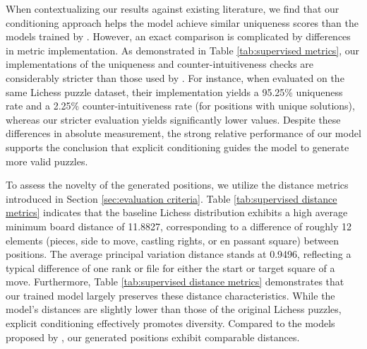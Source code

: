 When contextualizing our results against existing literature, we find that our conditioning approach helps the model achieve similar uniqueness scores than the models trained by \citeauthor{feng2025generatingcreativechesspuzzles} \cite{feng2025generatingcreativechesspuzzles}. However, an exact comparison is complicated by differences in metric implementation. As demonstrated in Table \ref{tab:supervised metrics}, our implementations of the uniqueness and counter-intuitiveness checks are considerably stricter than those used by \citeauthor{feng2025generatingcreativechesspuzzles} \cite{feng2025generatingcreativechesspuzzles}. For instance, when evaluated on the same Lichess puzzle dataset, their implementation yields a 95.25\% uniqueness rate and a 2.25\% counter-intuitiveness rate (for positions with unique solutions), whereas our stricter evaluation yields significantly lower values. Despite these differences in absolute measurement, the strong relative performance of our model supports the conclusion that explicit conditioning guides the model to generate more valid puzzles.

To assess the novelty of the generated positions, we utilize the distance metrics introduced in Section \ref{sec:evaluation criteria}. Table \ref{tab:supervised distance metrics} indicates that the baseline Lichess distribution exhibits a high average minimum board distance of 11.8827, corresponding to a difference of roughly 12 elements (pieces, side to move, castling rights, or en passant square) between positions. The average principal variation distance stands at 0.9496, reflecting a typical difference of one rank or file for either the start or target square of a move. Furthermore, Table \ref{tab:supervised distance metrics} demonstrates that our trained model largely preserves these distance characteristics. While the model's distances are slightly lower than those of the original Lichess puzzles, explicit conditioning effectively promotes diversity. Compared to the models proposed by \citeauthor{feng2025generatingcreativechesspuzzles} \cite{feng2025generatingcreativechesspuzzles}, our generated positions exhibit comparable distances.

